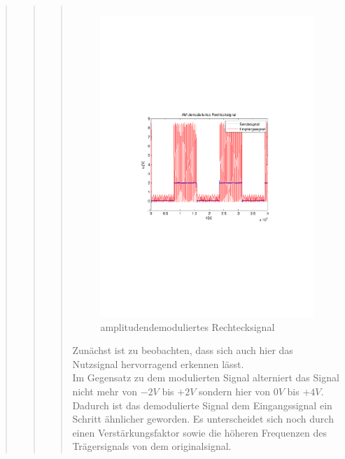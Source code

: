 \begin{quote}
\begin{quote}
\begin{quote}
\begin{center}
\begin{tabular}{ll}
                \end{tabular}
                \end{center}
                
                 \begin{figure}[H] \centering
                        \includegraphics[scale=0.5, trim = 4cm 9.5cm 3.5cm
                        9.5cm,clip]{./Bilder/synchDemod_rechteck}
                            \caption{amplitudendemoduliertes Rechtecksignal}
                    \end{figure}
                    
                    Zunächst ist zu beobachten, dass sich auch hier das Nutzsignal hervorragend
                    erkennen lässt.\\
                    Im Gegensatz zu dem modulierten Signal alterniert das Signal nicht mehr von $-2V$ bis $+2V$ sondern
                    hier von $0V$ bis $+4V$. Dadurch ist das demodulierte Signal dem Eingangssignal ein Schritt
                    ähnlicher geworden. Es unterscheidet sich noch durch einen Verstärkungsfaktor sowie die höheren
                    Frequenzen des Trägersignals von dem originalsignal.\vspace{1em}
                    

\end{quote}
\end{quote}
\end{quote}

